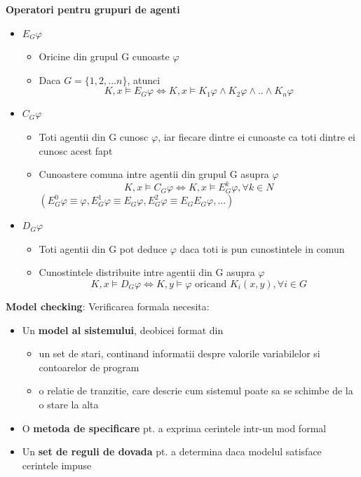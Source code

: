 \documentclass[10pt,a4paper,twocolumn]{report}
\begin{document}
\textbf{Operatori pentru grupuri de agenti}
\begin{itemize}
\item $E_G\varphi$
\begin{itemize}
	\item Oricine din grupul G cunoaste $\varphi$
	\item Daca $G = \{1,2,...n\}$, atunci
	\[K, x \models E_G\varphi \Leftrightarrow K,x \models K_1\varphi \wedge K_2\varphi \wedge .. \wedge K_n\varphi\]
\end{itemize}
\end{itemize}
\begin{itemize}
\item $C_G\varphi$
\begin{itemize}
\item Toti agentii din G cunosc $\varphi$, iar fiecare dintre ei cunoaste ca toti dintre ei cunosc acest fapt
\item Cunoastere comuna intre agentii din grupul G asupra $\varphi$
\[K,x \models C_G\varphi \Leftrightarrow K,x \models E_G^k \varphi, \forall k \in N\]
$(E_G^0\varphi \equiv \varphi, E_G^1\varphi \equiv E_G\varphi, E_G^2\varphi \equiv E_GE_G\varphi, ...)$
\end{itemize}
\end{itemize}
\hfill
\begin{itemize}
\item $D_G\varphi$
\begin{itemize}
\item Toti agentii din G pot deduce $\varphi$ daca toti is pun cunostintele in comun
\item Cunostintele distribuite intre agentii din G asupra $\varphi$
\[K,x \models D_G\varphi \Leftrightarrow K, y \models \varphi \textrm{ oricand } K_i(x,y), \forall i \in G\]
\end{itemize}
\end{itemize}

\textbf{Model checking}: Verificarea formala necesita:
\begin{itemize}
\item Un \textbf{model al sistemului}, deobicei format din
	\begin{itemize}
	\item un set de stari, continand informatii despre valorile variabilelor si contoarelor de program
	\item o relatie de tranzitie, care descrie cum sistemul poate sa se schimbe de la o stare la alta
	\end{itemize}
\item O \textbf{metoda de specificare} pt. a exprima cerintele intr-un mod formal
\item Un \textbf{set de reguli de dovada} pt. a determina daca modelul satisface cerintele impuse
\end{itemize}
\end{document}

